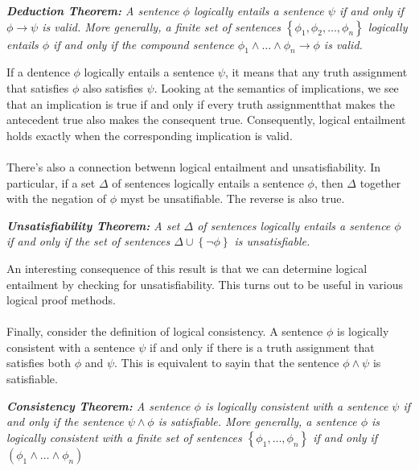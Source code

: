 \documentclass[10pt,a4pape,twocolumn]{article}
\newcounter{theo}
\begin{document}
                \begin{theorem}
                    \textit{\textbf{Deduction Theorem:} A sentence $\phi$ logically entails a sentence $\psi$ if and only if $\phi\rightarrow\psi$ is valid. More generally, a finite set of sentences $\left\{\phi_1,\phi_2,\dots,\phi_n\right\}$ logically entails $\phi$ if and only if the compound sentence $\phi_1\land\dots\land\phi_n\rightarrow \phi$ is valid.}
                \end{theorem}
                If a dentence $\phi$ logically entails a sentence $\psi$, it means that any truth assignment that satisfies $\phi$ also satisfies $\psi$. Looking at the semantics of implications, we see that an implication is true if and only if every truth assignmentthat makes the antecedent true also makes the consequent true. Consequently, logical entailment holds exactly when the corresponding implication is valid.
                \\
                \\
                There's also a connection betwenn logical entailment and unsatisfiability. In particular, if a set $\Delta$ of sentences logically entails a sentence $\phi$, then $\Delta$ together with the negation of $\phi$ myst be unsatifiable. The reverse is also true. 
                \begin{theorem}
                    \textit{\textbf{Unsatisfiability Theorem:} A set $\Delta$ of sentences logically entails a sentence $\phi$ if and only if the set of sentences $\Delta\cup\left\{\neg \phi\right\}$ is unsatisfiable.}
                \end{theorem}
                An interesting consequence of this result is that we can determine logical entailment by checking for unsatisfiability. This turns out to be useful in various logical proof methods.
                \\
                \\
                Finally, consider the definition of logical consistency. A sentence $\phi$ is logically consistent with a sentence $\psi$ if and only if there is a truth assignment that satisfies both $\phi$ and $\psi$. This is equivalent to sayin that the sentence $\phi\land\psi$ is satisfiable.
                \begin{theorem}
                    \textit{\textbf{Consistency Theorem:} A sentence $\phi$ is logically consistent with a sentence $\psi$ if and only if the sentence $\psi\land\phi$ is satisfiable. More generally, a sentence $\phi$ is logically consistent with a finite set of sentences $\left\{\phi_1,\dots,\phi_n\right\}$ if and only if $\left(\phi_1\land\dots\land\phi_n\right)$}
                \end{theorem}
\end{document}
